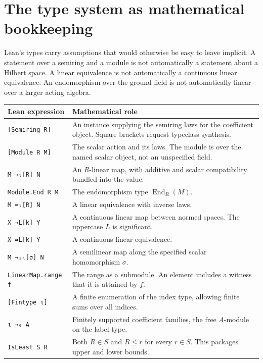 \documentclass[11pt,a4paper]{article}
\newcommand{\code}[1]{\nolinkurl{#1}}
\begin{document}
\clearpage


\section{The type system as mathematical bookkeeping}\label{sec:types}

Lean's types carry assumptions that would otherwise be easy to leave implicit. A statement over a semiring and a module is not automatically a statement about a Hilbert space. A linear equivalence is not automatically a continuous linear equivalence. An endomorphism over the ground field is not automatically linear over a larger acting algebra.

\begin{longtable}{p{}p{}}
\toprule Lean expression & Mathematical role \\\midrule\endhead
\code{[Semiring R]} & An instance supplying the semiring laws for the coefficient object. Square brackets request typeclass synthesis. \\
\code{[Module R M]} & The scalar action and its laws. The module is over the named scalar object, not an unspecified field. \\
\code{M →ₗ[R] N} & An $R$-linear map, with additive and scalar compatibility bundled into the value. \\
\code{Module.End R M} & The endomorphism type $\operatorname{End}_R(M)$. \\
\code{M ≃ₗ[R] N} & A linear equivalence with inverse laws. \\
\code{X →L[k] Y} & A continuous linear map between normed spaces. The uppercase $L$ is significant. \\
\code{X ≃L[k] Y} & A continuous linear equivalence. \\
\code{M →ₛₗ[σ] N} & A semilinear map along the specified scalar homomorphism $\sigma$. \\
\code{LinearMap.range f} & The range as a submodule. An element includes a witness that it is attained by $f$. \\
\code{[Fintype ι]} & A finite enumeration of the index type, allowing finite sums over all indices. \\
\code{ι →₀ A} & Finitely supported coefficient families, the free $A$-module on the label type. \\
\code{IsLeast S R} & Both $R\in S$ and $R\leq r$ for every $r\in S$. This packages upper and lower bounds. \\
\bottomrule
\end{longtable}
\end{document}
